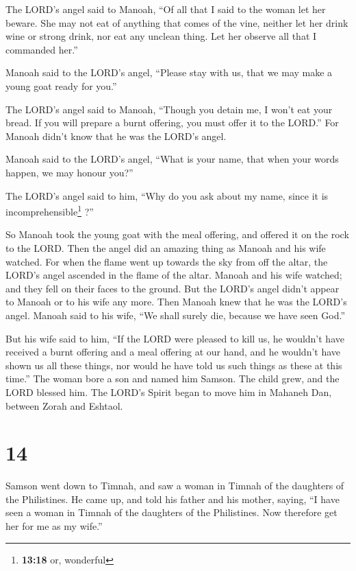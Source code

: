  The LORD's angel said to Manoah, ``Of all that I said to
the woman let her beware.  She may not eat of anything
that comes of the vine, neither let her drink wine or strong drink, nor
eat any unclean thing. Let her observe all that I commanded her.''

 Manoah said to the LORD's angel, ``Please stay with us,
that we may make a young goat ready for you.''

 The LORD's angel said to Manoah, ``Though you detain me,
I won't eat your bread. If you will prepare a burnt offering, you must
offer it to the LORD.'' For Manoah didn't know that he was the LORD's
angel.

 Manoah said to the LORD's angel, ``What is your name,
that when your words happen, we may honour you?''

 The LORD's angel said to him, ``Why do you ask about my
name, since it is incomprehensible\footnote{\textbf{13:18} or, wonderful}
?''

 So Manoah took the young goat with the meal offering,
and offered it on the rock to the LORD. Then the angel did an amazing
thing as Manoah and his wife watched.  For when the flame
went up towards the sky from off the altar, the LORD's angel ascended in
the flame of the altar. Manoah and his wife watched; and they fell on
their faces to the ground.  But the LORD's angel didn't
appear to Manoah or to his wife any more. Then Manoah knew that he was
the LORD's angel.  Manoah said to his wife, ``We shall
surely die, because we have seen God.''

 But his wife said to him, ``If the LORD were pleased to
kill us, he wouldn't have received a burnt offering and a meal offering
at our hand, and he wouldn't have shown us all these things, nor would
he have told us such things as these at this time.''  The
woman bore a son and named him Samson. The child grew, and the LORD
blessed him.  The LORD's Spirit began to move him in
Mahaneh Dan, between Zorah and Eshtaol.

\hypertarget{section-13}{%
\section{14}\label{section-13}}

 Samson went down to Timnah, and saw a woman in Timnah of
the daughters of the Philistines.  He came up, and told
his father and his mother, saying, ``I have seen a woman in Timnah of
the daughters of the Philistines. Now therefore get her for me as my
wife.''

